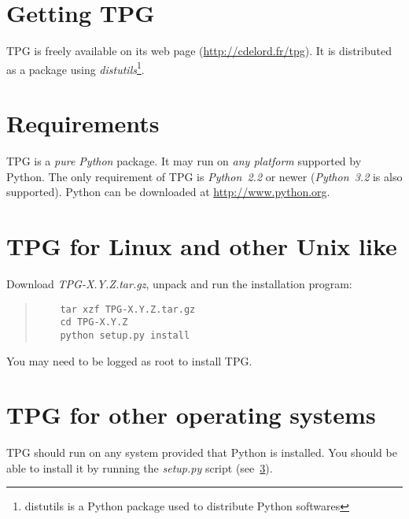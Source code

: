 
\section{Getting TPG}

TPG is freely available on its web page (\url{http://cdelord.fr/tpg}). It is distributed as a package using \emph{distutils}\footnote{distutils is a Python package used to distribute Python softwares}.

\section{Requirements}

TPG is a \emph{pure Python} package.
It may run on \emph{any platform} supported by Python.
The only requirement of TPG is \emph{Python~2.2} or newer (\emph{Python~3.2} is also supported). Python can be downloaded at \url{http://www.python.org}.

\section{TPG for Linux and other Unix like}                 \label{linux_install}

Download \mbox{\emph{TPG-X.Y.Z.tar.gz}}, unpack and run the installation program:
\begin{quote}
\begin{verbatim}
    tar xzf TPG-X.Y.Z.tar.gz
    cd TPG-X.Y.Z
    python setup.py install
\end{verbatim}
\end{quote}
You may need to be logged as root to install TPG.

\section{TPG for other operating systems}

TPG should run on any system provided that Python is installed. You should be able to install it by running the \mbox{\emph{setup.py}} script (see~\ref{linux_install}).
